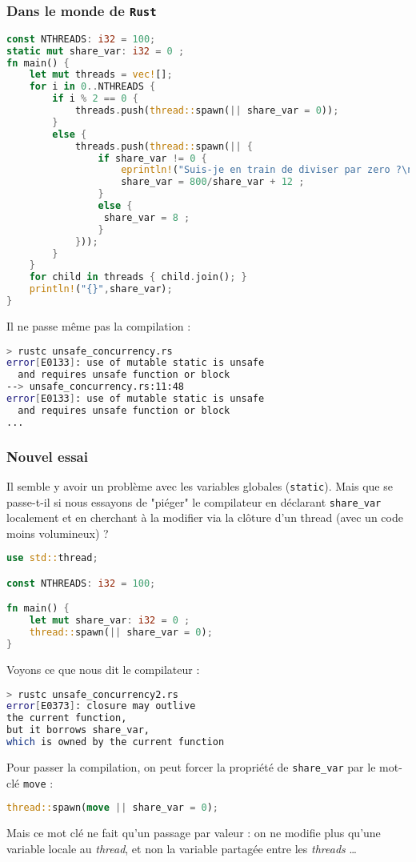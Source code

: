 \begin{frame}[fragile]
  \frametitle{Dans le monde de \texttt{Rust}}
  \begin{lstlisting}[language=rust, basicstyle=\tiny{}]
const NTHREADS: i32 = 100;
static mut share_var: i32 = 0 ;
fn main() {
    let mut threads = vec![];
    for i in 0..NTHREADS {
        if i % 2 == 0 {
            threads.push(thread::spawn(|| share_var = 0));
        }
        else {
            threads.push(thread::spawn(|| {
                if share_var != 0 {
                    eprintln!("Suis-je en train de diviser par zero ?\n");
                    share_var = 800/share_var + 12 ;
                }
                else {
                 share_var = 8 ;
                }
            }));
        }
    }
    for child in threads { child.join(); }
    println!("{}",share_var);
}
  \end{lstlisting} 
\end{frame}
\begin{frame}[fragile]
Il ne passe même pas la compilation :

\begin{lstlisting}[language=bash]
> rustc unsafe_concurrency.rs
error[E0133]: use of mutable static is unsafe
  and requires unsafe function or block
--> unsafe_concurrency.rs:11:48
error[E0133]: use of mutable static is unsafe
  and requires unsafe function or block
...
\end{lstlisting}
\end{frame}
\begin{frame}[fragile]
  \frametitle{Nouvel essai}
  Il semble y avoir un problème avec les variables globales (\texttt{static}). Mais que se passe-t-il si nous essayons de "piéger" le compilateur en déclarant \texttt{share\_var} localement et en cherchant à la modifier via la clôture d'un thread (avec un code moins volumineux) ?
  \begin{lstlisting}[language=rust]
use std::thread;

const NTHREADS: i32 = 100;

fn main() {
    let mut share_var: i32 = 0 ;
    thread::spawn(|| share_var = 0);
}
  \end{lstlisting}
\end{frame}
\begin{frame}[fragile]
Voyons ce que nous dit le compilateur :
\begin{lstlisting}[language=bash]
> rustc unsafe_concurrency2.rs
error[E0373]: closure may outlive
the current function,
but it borrows share_var,
which is owned by the current function
\end{lstlisting}
Pour passer la compilation, on peut forcer la propriété de \texttt{share\_var} par le mot-clé \texttt{move} :
\begin{lstlisting}[language=rust]
thread::spawn(move || share_var = 0);
\end{lstlisting}

Mais ce mot clé ne fait qu'un passage par valeur : on ne modifie plus qu'une
variable locale au
\textit{thread}, et non la variable partagée entre les \textit{threads} \dots
\end{frame}

